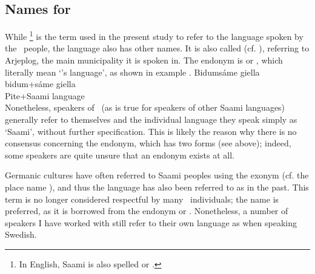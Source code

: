 \subsection{Names for \PS}\label{onomastics}
While \footnote{In English, Saami is also spelled  or .} %
is the term used in the present study to refer to the language spoken by the \PS\ people, the language also has other names. It is also called  (cf. %
\citealt{Lehtiranta1992}), referring to Arjeplog, the main municipality it is spoken in. The endonym is  or , which literally mean ‘\PS’s language’, as shown in example . 
\ea\label{bidumsaamegiella}
\glll Bidumsáme giella\\ %
	bidum+sáme giella\\
	Pite+Saami\BS{} language\BS{}\\\nopagebreak
{} 
\z
Nonetheless, speakers of \PS\ (as is true for speakers of other Saami languages) generally refer to themselves and the individual language they speak simply as ‘Saami’, without further specification. This is likely the reason why there is no consensus concerning the endonym, which has  two forms (see above); indeed, some speakers are quite unsure that an endonym exists at all. %

Germanic cultures have often referred to Saami peoples using the exonym  (cf. the place name ), and thus the language has also been referred to as  in the past. This term is no longer considered respectful by many \PS\ individuals; the name  is preferred, as it is borrowed from the endonym  or . Nonetheless, a number of speakers I have worked with still refer to their own language as  when speaking Swedish. 

